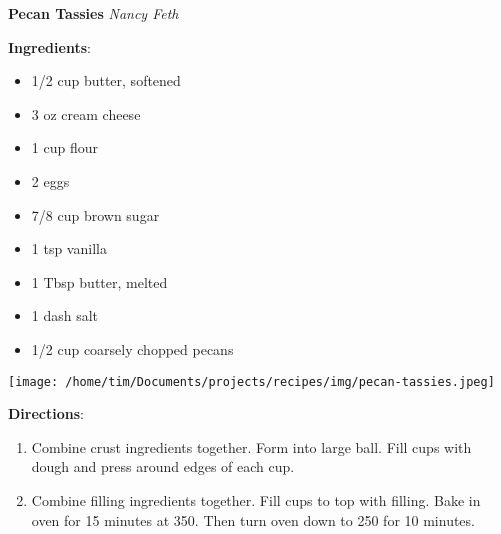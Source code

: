 \documentclass[11pt, twoside, openany]{book}
\begin{document}
\noindent\begin{minipage}[t]{\linewidth}%
{\Large\textbf{Pecan Tassies}} \label{pecan-tassies}\hfill\textit{Nancy Feth}\\
\noindent\begin{minipage}[t]{0.78\linewidth}%
\textbf{Ingredients}:\vspace{-3mm}
\begin{multicols}{2}
\begin{itemize}\setlength\itemsep{-1mm}
\item 1/2 cup butter, softened
\item 3 oz cream cheese
\item 1 cup flour
\item 2 eggs
\item 7/8 cup brown sugar
\item 1 tsp vanilla
\item 1 Tbsp butter, melted
\item 1 dash salt
\item 1/2 cup coarsely chopped pecans
\end{itemize}
\end{multicols}
\end{minipage}
\noindent\begin{minipage}[t]{0.18\linewidth}
\centering \strut\vspace*{-\baselineskip}\newline
\texttt{[image: /home/tim/Documents/projects/recipes/img/pecan-tassies.jpeg]}\\
\end{minipage}\vspace{3mm}
\textbf{Directions}:
\vspace{-3mm}\begin{enumerate}\setlength\itemsep{-1mm}
\item Combine crust ingredients together. Form into large ball. Fill cups with dough and press around edges of each cup.
\item Combine filling ingredients together. Fill cups to top with filling. Bake in oven for 15 minutes at 350. Then turn oven down to 250 for 10 minutes. 
\end{enumerate}
\end{minipage}\vspace{8mm}
\end{document}
